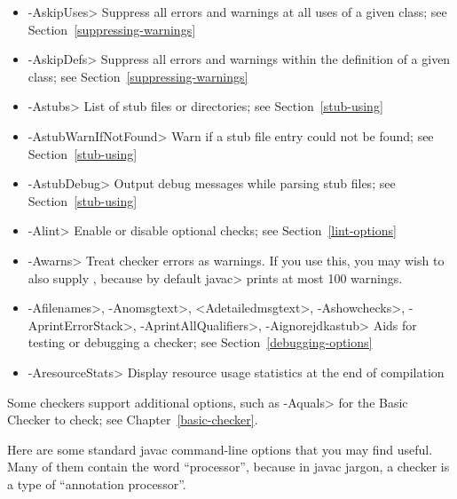 \begin{itemize}
\item \<-AskipUses> Suppress all errors and warnings at all uses of a
  given class; see Section~\ref{suppressing-warnings}
\item \<-AskipDefs> Suppress all errors and warnings within the definition of a
  given class; see Section~\ref{suppressing-warnings}
\item \<-Astubs> List of stub files or directories; see Section~\ref{stub-using}
\item \<-AstubWarnIfNotFound> Warn if a stub file entry could not be found; see Section~\ref{stub-using}
\item \<-AstubDebug> Output debug messages while parsing stub files; see Section~\ref{stub-using}
\item \<-Alint> Enable or disable optional checks; see Section~\ref{lint-options}
\item \<-Awarns> Treat checker errors as warnings.  If you use this, you
  may wish to also supply , because by default
  \<javac> prints at most 100 warnings.
\item \<-Afilenames>, \<-Anomsgtext>, <\-Adetailedmsgtext>, \<-Ashowchecks>, \<-AprintErrorStack>,
  \<-AprintAllQualifiers>, \<-Aignorejdkastub>
  Aids for testing or debugging a checker; see Section~\ref{debugging-options}
\item \<-AresourceStats> Display resource usage statistics at the end of compilation
\end{itemize}

\noindent
Some checkers support additional options, such as \<-Aquals> for the Basic
Checker to check; see Chapter~\ref{basic-checker}.


Here are some standard javac command-line options that you may find useful.
Many of them contain the word ``processor'', because in javac jargon, a
checker is a type of ``annotation processor''.

